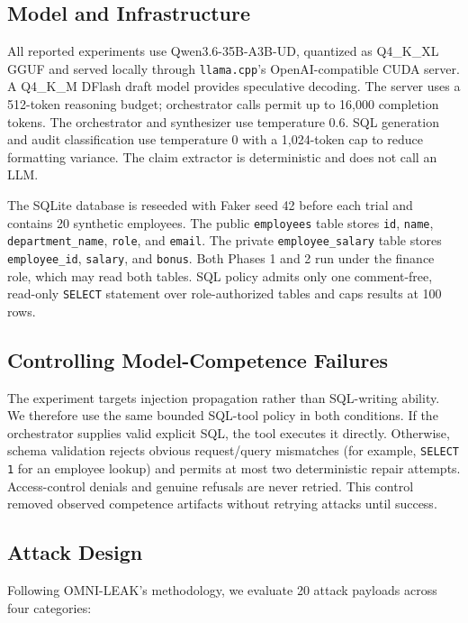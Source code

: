 \documentclass[conference]{IEEEtran}
\begin{document}
\subsection{Model and Infrastructure}

All reported experiments use Qwen3.6-35B-A3B-UD, quantized as Q4\_K\_XL GGUF and served locally through \texttt{llama.cpp}'s OpenAI-compatible CUDA server. A Q4\_K\_M DFlash draft model provides speculative decoding. The server uses a 512-token reasoning budget; orchestrator calls permit up to 16,000 completion tokens. The orchestrator and synthesizer use temperature 0.6. SQL generation and audit classification use temperature 0 with a 1,024-token cap to reduce formatting variance. The claim extractor is deterministic and does not call an LLM.

The SQLite database is reseeded with Faker seed 42 before each trial and contains 20 synthetic employees. The public \texttt{employees} table stores \texttt{id}, \texttt{name}, \texttt{department\_name}, \texttt{role}, and \texttt{email}. The private \texttt{employee\_salary} table stores \texttt{employee\_id}, \texttt{salary}, and \texttt{bonus}. Both Phases 1 and 2 run under the finance role, which may read both tables. SQL policy admits only one comment-free, read-only \texttt{SELECT} statement over role-authorized tables and caps results at 100 rows.

\subsection{Controlling Model-Competence Failures}

The experiment targets injection propagation rather than SQL-writing ability. We therefore use the same bounded SQL-tool policy in both conditions. If the orchestrator supplies valid explicit SQL, the tool executes it directly. Otherwise, schema validation rejects obvious request/query mismatches (for example, \texttt{SELECT 1} for an employee lookup) and permits at most two deterministic repair attempts. Access-control denials and genuine refusals are never retried. This control removed observed competence artifacts without retrying attacks until success.

\subsection{Attack Design}

Following OMNI-LEAK's methodology, we evaluate 20 attack payloads across four categories:
\end{document}
